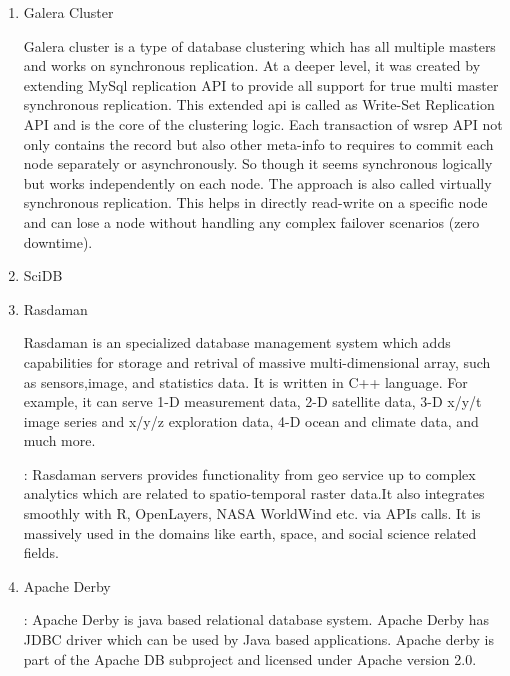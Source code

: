 \begin{enumerate}
\item {} 
Galera Cluster

Galera cluster \label{\detokenize{i524/technologies:id376}}{\hyperref[\detokenize{i524/technologies:www-galera-cluster}]{\sphinxcrossref{{[}320{]}}}} is a type of database
clustering which has all multiple masters and works on
synchronous replication. At a deeper level, it was created by
extending MySql replication API to provide all support for true
multi master synchronous replication.  This extended api is
called as Write-Set Replication API and is the core of the
clustering logic.  Each transaction of wsrep API not only
contains the record but also other meta-info to requires to
commit each node separately or asynchronously. So though it seems
synchronous logically but works independently on each node.  The
approach is also called virtually synchronous replication. This
helps in directly read-write on a specific node and can lose a
node without handling any complex failover scenarios (zero
downtime).

\item {} 
SciDB

\item {} 
Rasdaman

Rasdaman is an specialized database management system which adds
capabilities for storage and retrival of massive
multi-dimensional array, such as sensors,image, and statistics
data. \label{\detokenize{i524/technologies:id377}}{\hyperref[\detokenize{i524/technologies:www-rasdaman-wiki}]{\sphinxcrossref{{[}321{]}}}} It is written in C++
language. For example, it can serve 1-D measurement data, 2-D
satellite data, 3-D x/y/t image series and x/y/z exploration
data, 4-D ocean and climate data, and much more.

\label{\detokenize{i524/technologies:id378}}{\hyperref[\detokenize{i524/technologies:www-rasdaman-official}]{\sphinxcrossref{{[}322{]}}}}: Rasdaman servers provides
functionality from geo service up to complex analytics which are
related to spatio-temporal raster data.It also integrates
smoothly with R, OpenLayers, NASA WorldWind etc. via APIs
calls. It is massively used in the domains like earth, space,
and social science related fields.

\item {} 
Apache Derby

\label{\detokenize{i524/technologies:id379}}{\hyperref[\detokenize{i524/technologies:www-apachederby}]{\sphinxcrossref{{[}323{]}}}}: Apache Derby is java based relational
database system. Apache Derby has JDBC driver which can be used
by Java based applications. Apache derby is part of the Apache DB
subproject and licensed under Apache version 2.0.


\end{enumerate}
